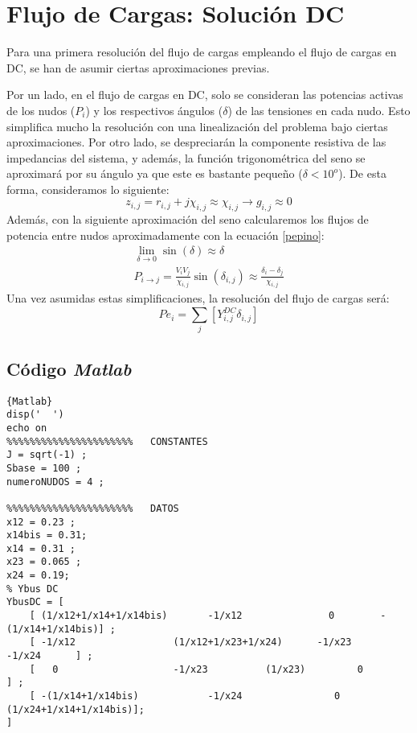 \documentclass[a4paper,10pt,titlepage,oneside]{article}
\begin{document}
{\section{Flujo de Cargas: Solución DC}
Para una primera resolución del flujo de cargas empleando el flujo de cargas en DC, se han de asumir ciertas aproximaciones previas. 

Por un lado, en el flujo de cargas en DC, solo se consideran las potencias activas de los nudos ($P_i$) y los respectivos ángulos ($\delta$) de las tensiones en cada nudo. Esto simplifica mucho la resolución con una linealización del problema bajo ciertas aproximaciones.
Por otro lado, se despreciarán la componente resistiva de las impedancias del sistema, y además, la función trigonométrica del seno se aproximará por su ángulo ya que este es bastante pequeño ($\delta  <10^o$). De esta forma, consideramos lo siguiente:
\begin{equation}
    z_{i,j} = r_{i,j}+j\chi_{i,j} \approx \chi_{i,j} \rightarrow g_{i,j}\approx 0
\end{equation}
Además, con la siguiente aproximación del seno calcularemos los flujos de potencia entre nudos aproximadamente con la ecuación \ref{pepino}:
\begin{gather}
\lim_{\delta \to 0}\sin(\delta)\approx \delta\\
    P_{i\rightarrow j} = \frac{V_i V_j}{\chi_{i,j}}\sin(\delta_{i,j})\approx \frac{\delta_i-\delta_j}{\chi_{i,j}}
    \label{pepino}
\end{gather}
Una vez asumidas estas simplificaciones, la resolución del flujo de cargas será:
\begin{equation}
    Pe_i = \sum_{j} [Y_{i,j}^{DC}\delta_{i,j}]
\end{equation}

\subsection{Código \textit{Matlab}}
\lstset{language=Matlab, breaklines=true}
\begin{lstlisting}[frame=lines]{Matlab}
disp('  ')
echo on
%%%%%%%%%%%%%%%%%%%%%%   CONSTANTES
J = sqrt(-1) ;
Sbase = 100 ;
numeroNUDOS = 4 ;

%%%%%%%%%%%%%%%%%%%%%%   DATOS
x12 = 0.23 ;
x14bis = 0.31;
x14 = 0.31 ;
x23 = 0.065 ;
x24 = 0.19;
% Ybus DC
YbusDC = [
	[ (1/x12+1/x14+1/x14bis)       -1/x12               0        -(1/x14+1/x14bis)] ;
	[ -1/x12                 (1/x12+1/x23+1/x24)      -1/x23          -1/x24      ] ;
	[   0                    -1/x23          (1/x23)         0        ] ;
    [ -(1/x14+1/x14bis)            -1/x24                0      (1/x24+1/x14+1/x14bis)];                          
] 


\end{lstlisting}}
\end{document}
